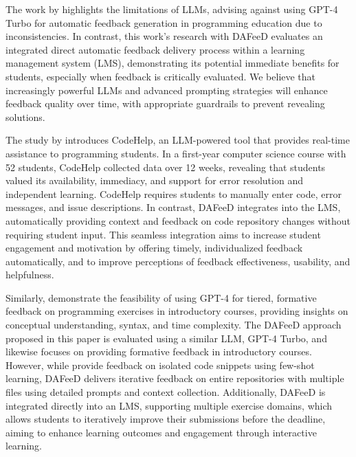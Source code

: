 \documentclass[sigconf,screen,review,anonymous]{acmart}
\begin{document}
The work by \citet{azaiz:2024:FeedbackGenerationProgrammingExercises} highlights the limitations of LLMs, advising against using GPT-4 Turbo for automatic feedback generation in programming education due to inconsistencies.
In contrast, this work's research with DAFeeD evaluates an integrated direct automatic feedback delivery process within a learning management system (LMS), demonstrating its potential immediate benefits for students, especially when feedback is critically evaluated.
We believe that increasingly powerful LLMs and advanced prompting strategies will enhance feedback quality over time, with appropriate guardrails to prevent revealing solutions.


The study by \citet{liffiton:2024:CodeHelpUsingLarge} introduces CodeHelp, an LLM-powered tool that provides real-time assistance to programming students.
In a first-year computer science course with 52 students, CodeHelp collected data over 12 weeks, revealing that students valued its availability, immediacy, and support for error resolution and independent learning.
CodeHelp requires students to manually enter code, error messages, and issue descriptions.
In contrast, DAFeeD integrates into the LMS, automatically providing context and feedback on code repository changes without requiring student input.
This seamless integration aims to increase student engagement and motivation by offering timely, individualized feedback automatically, and to improve perceptions of feedback effectiveness, usability, and helpfulness.


Similarly, \citet{nguyen:2024:UsingGPT4Providea} demonstrate the feasibility of using GPT-4 for tiered, formative feedback on programming exercises in introductory courses, providing insights on conceptual understanding, syntax, and time complexity.
The DAFeeD approach proposed in this paper is evaluated using a similar LLM, GPT-4 Turbo, and likewise focuses on providing formative feedback in introductory courses.
However, while \citet{nguyen:2024:UsingGPT4Providea} provide feedback on isolated code snippets using few-shot learning, DAFeeD delivers iterative feedback on entire repositories with multiple files using detailed prompts and context collection.
Additionally, DAFeeD is integrated directly into an LMS, supporting multiple exercise domains, which allows students to iteratively improve their submissions before the deadline, aiming to enhance learning outcomes and engagement through interactive learning.
\end{document}
